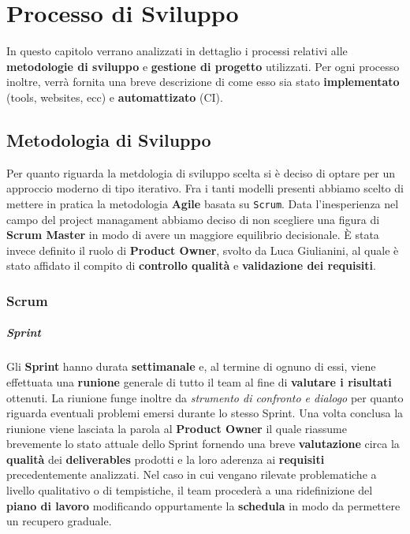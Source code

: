 \chapter{Processo di Sviluppo}
In questo capitolo verrano analizzati in dettaglio i processi relativi alle \textbf{metodologie di sviluppo} e \textbf{gestione di progetto} utilizzati. Per ogni processo inoltre, verrà fornita una breve descrizione di come esso sia stato \textbf{implementato} (tools, websites, ecc) e \textbf{automattizato} (CI).  
\section{Metodologia di Sviluppo}
Per quanto riguarda la metdologia di sviluppo scelta si è deciso di optare per un approccio moderno di tipo iterativo. Fra i tanti modelli presenti abbiamo scelto di mettere in pratica la metodologia \textbf{Agile} basata su \texttt{Scrum}. Data l'inesperienza nel campo del project managament abbiamo deciso di non scegliere una figura di \textbf{Scrum Master} in modo di avere un maggiore equilibrio decisionale. È stata invece definito il ruolo di \textbf{Product Owner}, svolto da Luca Giulianini, al quale è stato affidato il compito di \textbf{controllo qualità} e \textbf{validazione dei requisiti}.

\subsection{Scrum}
\label{subsec:scrum}
	\paragraph{Sprint} %
	\label{par:sprint}
	Gli \textbf{Sprint} hanno durata \textbf{settimanale} e, al termine di ognuno di essi, viene effettuata una \textbf{runione} generale di tutto il team al fine di \textbf{valutare i risultati} ottenuti. La riunione funge inoltre da \textit{strumento di confronto e dialogo} per quanto riguarda eventuali problemi emersi durante lo stesso Sprint. Una volta conclusa la riunione viene lasciata la parola al \textbf{Product Owner} il quale riassume brevemente lo stato attuale dello Sprint fornendo una breve \textbf{valutazione} circa la \textbf{qualità} dei \textbf{deliverables} prodotti e la loro aderenza ai \textbf{requisiti} precedentemente analizzati. Nel caso in cui vengano rilevate problematiche a livello qualitativo o di tempistiche, il team procederà a una ridefinizione del \textbf{piano di lavoro} modificando oppurtamente la \textbf{schedula} in modo da permettere un recupero graduale.
